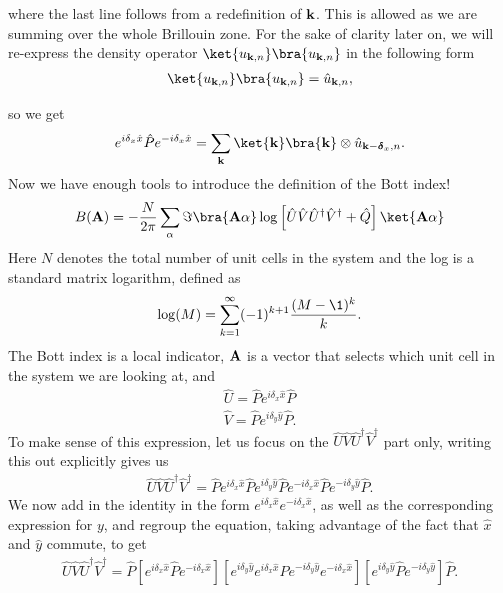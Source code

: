 where the last line follows from a redefinition of $\textbf k$. This is allowed as we are summing over the whole Brillouin zone. For the sake of clarity later on, we will re-express the density operator $\ket{u_{\textbf k, n}}\bra{u_{\textbf k, n}}$ in the following form
\begin{align}
	\ket{u_{\textbf k, n}}\bra{u_{\textbf k, n}} = \hat u_{\textbf k, n},
\end{align}\par
so we get
\begin{align} \label{eqn:p_identity}
	e^{i \delta_x \hat x} \hat P e^{-i \delta_x \hat x}  =  \sum_{\textbf k} \ket{\textbf k } \bra{\textbf k } \otimes \hat u_{\textbf k-\boldsymbol{\delta}_x, n}.
\end{align}
Now we have enough tools to introduce the definition of the Bott index!
\begin{align}\label{eqn:bott_index}
    B(\textbf A) = -\frac{N}{2\pi} \sum_\alpha \Im \bra{\textbf A \alpha} \log \left [ \hat U\hat V\hat U^\dag \hat V^\dag + \hat Q \right ]\ket{ \textbf A \alpha}
\end{align}
Here $N$ denotes the total number of unit cells in the system and the log is a standard matrix logarithm, defined as
\begin{align}
	\log (M) = \sum_{k=1}^\infty (-1)^{k+1} \frac{(M-\1)^k}{k}.
\end{align}
The Bott index is a local indicator, $\textbf A$ is a vector that selects which unit cell in the system we are looking at, and
\begin{align}
	\hat U  = \hat P e^{i \delta_x \hat x} \hat P \\
	\hat V  = \hat P e^{i \delta_y \hat y} \hat P.
\end{align}
To make sense of this expression, let us focus on the $ \hat U\hat V\hat U^\dag \hat V^\dag$ part only, writing this out explicitly gives us
\begin{align}
	 \hat U\hat V\hat U^\dag \hat V^\dag = \hat P e^{i \delta_x \hat x} \hat P e^{i \delta_y \hat y} \hat P e^{- i \delta_x \hat x} \hat P e^{-i \delta_y \hat y} \hat P.
\end{align}
We now add in the identity in the form $e^{i \delta_x \hat x} e^{-i \delta_x \hat x} $, as well as the corresponding expression for $y$, and regroup the equation, taking advantage of the fact that $\hat x$ and $\hat y$ commute, to get
\begin{align}
	 \hat U\hat V\hat U^\dag \hat V^\dag =  \hat P
	  \left [ e^{i \delta_x \hat x} \hat P e^{-i \delta_x \hat x} \right]
	  \left [ e^{i \delta_y \hat y} e^{i \delta_x \hat x} \hat P  e^{-i \delta_y \hat y} e^{- i \delta_x \hat x } \right]
	  \left [ e^{i \delta_y \hat y} \hat P e^{-i \delta_y \hat y } \right]
	 \hat P.
\end{align}
